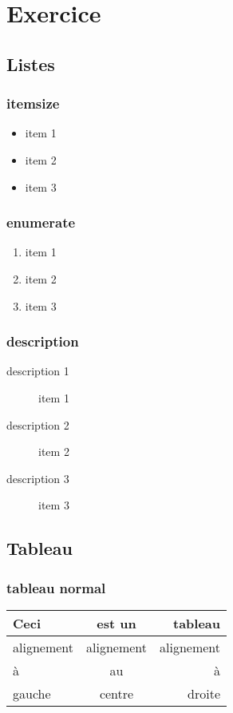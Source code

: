 \documentclass[a4paper]{article}
\begin{document}
\section{Exercice}

\subsection{Listes}

\subsubsection{itemsize}

\begin{itemize}
    \item item 1
    \item item 2
    \item item 3
\end{itemize}

\subsubsection{enumerate}

\begin{enumerate}
    \item item 1
    \item item 2
    \item item 3
\end{enumerate}

\subsubsection{description}

\begin{description}
    \item[description 1] item 1
    \item[description 2] item 2
    \item[description 3] item 3  
\end{description}

\subsection{Tableau}

\subsubsection{tableau normal}

\begin{tabular}{|l|c|r|}
    \hline
        Ceci        & est un        & tableau       \\
    \hline
    \hline
        alignement  & alignement    & alignement    \\
    \hline
    \hline
        à           & au            & à             \\
    \hline
    \hline
        gauche      & centre        & droite        \\
    \hline
\end{tabular}
\end{document}

